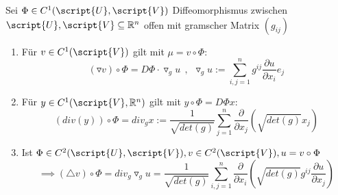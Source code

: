   \begin{theorem}
    Sei $\Phi \in C^1(\script{U}, \script{V})$ Diffeomorphismus zwischen $\script{U}, \script{V} \subseteq \mathbb{R}^n$ offen mit gramscher Matrix $(g_{ij})$
    \begin{enumerate}
      \item Für $v \in C^1(\script{V})$ gilt mit $\mu = v \circ \Phi$:
      $$(\triangledown v) \circ \Phi = D\Phi \cdot \triangledown_g u \ \ , \ \ \triangledown_g u := \sum\limits_{i,j=1}^n g^{ij} \frac{\partial u}{\partial x_i} e_j$$
      \item Für $y \in C^1(\script{V}, \mathbb{R}^n)$ gilt mit $y \circ \Phi = D\Phi x$:
        $$(div(y)) \circ \Phi = div_g x := \frac{1}{\sqrt{det(g)}} \sum\limits_{j=1}^n \frac{\partial}{\partial x_j} (\sqrt{det(g)} x_j)$$
      \item Ist $\Phi \in C^2(\script{U}, \script{V}), v \in C^2(\script{V}), u = v \circ \Phi$
        $$\implies (\triangle v) \circ \Phi = div_g \triangledown_g u = \frac{1}{\sqrt{det(g)}} \sum\limits_{i,j=1}^n \frac{\partial}{\partial x_i} (\sqrt{det(g)} g^{ij} \frac{\partial u}{\partial x_j})$$
    \end{enumerate}
  \end{theorem}

